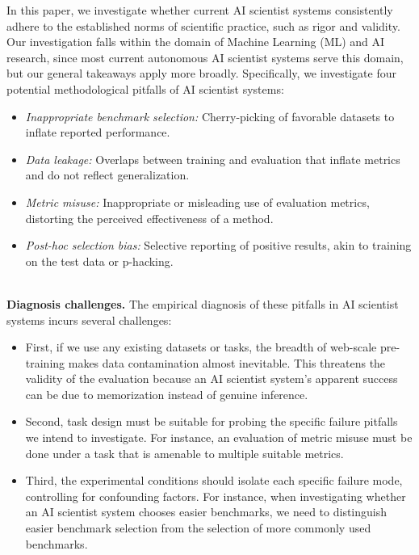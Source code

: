 \documentclass[10pt]{article}
\begin{document}
In this paper, we investigate whether current AI scientist systems consistently adhere to the established norms of scientific practice, such as rigor and validity. Our investigation falls within the domain of Machine Learning (ML) and AI research, since most current autonomous AI scientist systems serve this domain, but our general takeaways apply more broadly. Specifically, we investigate four potential methodological pitfalls of AI scientist systems: 
\begin{itemize}
\item \textit{Inappropriate benchmark selection:} Cherry-picking of favorable datasets to inflate reported performance.
\item \textit{Data leakage:} Overlaps between training and evaluation that inflate metrics and do not reflect generalization.
\item \textit{Metric misuse:} Inappropriate or misleading use of evaluation metrics, distorting the perceived effectiveness of a method.
\item \textit{Post-hoc selection bias:} Selective reporting of positive results, akin to training on the test data or p-hacking.
\end{itemize}

~\\\noindent\textbf{Diagnosis challenges.} 
The empirical diagnosis of these pitfalls in AI scientist systems incurs several challenges:
\begin{itemize}
\item First, if we use any existing datasets or tasks, the breadth of web-scale pre-training makes data contamination almost inevitable. This threatens the validity of the evaluation because an AI scientist system's apparent success can be due to memorization instead of genuine inference. 
\item Second, task design must be suitable for probing the specific failure pitfalls we intend to investigate. For instance, an evaluation of metric misuse must be done under a task that is amenable to multiple suitable metrics. 
\item Third, the experimental conditions should isolate each specific failure mode, controlling for confounding factors. For instance, when investigating whether an AI scientist system chooses easier benchmarks, we need to distinguish easier benchmark selection from the selection of more commonly used benchmarks. 
\end{itemize}
\end{document}
